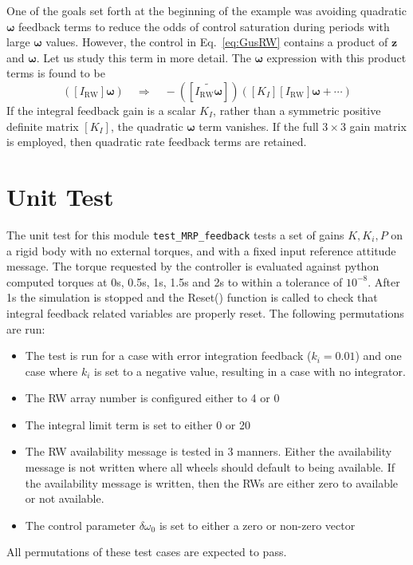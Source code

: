 \documentclass[]{BasiliskReportMemo}
\begin{document}
		One of the goals set forth at the beginning of the example was avoiding quadratic $\bm\omega$ feedback terms to reduce the odds of control saturation during periods with large $\bm\omega$ values.  However, the control in Eq.~\eqref{eq:GusRW} contains a product of $\bm z$ and $\bm\omega$.  Let us study this term in more detail.  The $\bm\omega$ expression with this product terms is found to be
		\begin{equation*}
			[\widetilde{K_{I}\bm z}] ([I_{\text{RW}}]\bm \omega)
			 \quad \Rightarrow \quad 
			-  (
			[\widetilde{I_{\text{RW}} \bm \omega}] 
			 ) ([K_{I}] [I_{\text{RW}}] \bm \omega + \cdots )
		\end{equation*}
		If the integral feedback gain is a scalar $K_{I}$, rather than a symmetric positive definite matrix $[K_{I}]$, the quadratic $\bm\omega$ term vanishes.  If the full $3\times 3$ gain matrix is employed, then quadratic rate feedback terms are retained.  

\section{Unit Test}
The unit test for this module \verb|test_MRP_feedback| tests a set of gains $K,K_i,P$ on a rigid body with no external torques, and with a fixed input reference attitude message. The torque requested by the controller is evaluated against python computed torques at 0s, 0.5s, 1s, 1.5s and 2s to within a tolerance of $10^{-8}$. After 1s the simulation is stopped and the Reset() function is called to check that integral feedback related variables are properly reset.  The following permutations are run:
\begin{itemize}
	\item The test is run for a case with error integration feedback ($k_i=0.01$) and one case where $k_i$ is set to a negative value, resulting in a case with no integrator. 
	\item The RW array number is configured either to 4 or 0
	\item The integral limit term is set to either 0 or 20
	\item The RW availability message is tested in 3 manners.  Either the availability  message is not written where all wheels should default to being available.  If the availability message is written, then the RWs are either zero to available or not available.
	\item The control parameter $\delta\omega_{0}$ is set to either a zero or non-zero vector
\end{itemize}
All permutations of these test cases are expected to pass.
\end{document}
